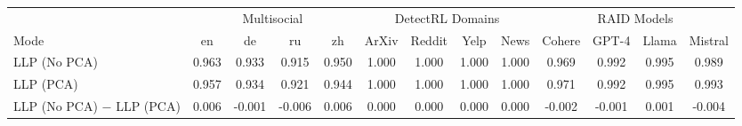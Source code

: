 \begin{tabular}{lcccccccccccc}
\toprule
 & \multicolumn{4}{c}{Multisocial} & \multicolumn{4}{c}{DetectRL Domains} & \multicolumn{4}{c}{RAID Models} \\
\cmidrule(lr){2-5} \cmidrule(lr){6-9} \cmidrule(lr){10-13}
Mode & en & de & ru & zh & ArXiv & Reddit & Yelp & News & Cohere & GPT-4 & Llama & Mistral \\
\midrule
LLP (No PCA) & 0.963 & 0.933 & 0.915 & 0.950 & 1.000 & 1.000 & 1.000 & 1.000 & 0.969 & 0.992 & 0.995 & 0.989 \\
LLP (PCA) & 0.957 & 0.934 & 0.921 & 0.944 & 1.000 & 1.000 & 1.000 & 1.000 & 0.971 & 0.992 & 0.995 & 0.993 \\
\midrule
LLP (No PCA) $-$ LLP (PCA) & 0.006 & -0.001 & -0.006 & 0.006 & 0.000 & 0.000 & 0.000 & 0.000 & -0.002 & -0.001 & 0.001 & -0.004 \\
\bottomrule
\end{tabular}
